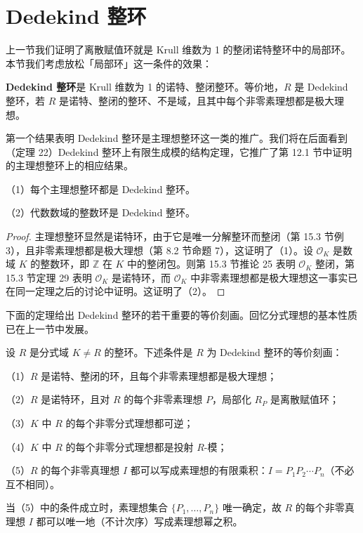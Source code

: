 \section{Dedekind 整环}

上一节我们证明了离散赋值环就是 Krull 维数为 1 的整闭诺特整环中的局部环。本节我们考虑放松「局部环」这一条件的效果：

\begin{definition}
\textbf{Dedekind 整环}是 Krull 维数为 1 的诺特、整闭整环。等价地，\(R\) 是 Dedekind 整环，若 \(R\) 是诺特、整闭的整环、不是域，且其中每个非零素理想都是极大理想。
\end{definition}

第一个结果表明 Dedekind 整环是主理想整环这一类的推广。我们将在后面看到（定理 22）Dedekind 整环上有限生成模的结构定理，它推广了第 12.1 节中证明的主理想整环上的相应结果。

\begin{proposition}\label{pro:16.14}
（1）每个主理想整环都是 Dedekind 整环。

（2）代数数域的整数环是 Dedekind 整环。
\end{proposition}

\begin{proof}
主理想整环显然是诺特环，由于它是唯一分解整环而整闭（第 15.3 节例 3），且非零素理想都是极大理想（第 8.2 节命题 7），这证明了（1）。设 \(\mathcal{O}_K\) 是数域 \(K\) 的整数环，即 \(\mathbb{Z}\) 在 \(K\) 中的整闭包。则第 15.3 节推论 25 表明 \(\mathcal{O}_K\) 整闭，第 15.3 节定理 29 表明 \(\mathcal{O}_K\) 是诺特环，而 \(\mathcal{O}_K\) 中非零素理想都是极大理想这一事实已在同一定理之后的讨论中证明。这证明了（2）。
\end{proof}

下面的定理给出 Dedekind 整环的若干重要的等价刻画。回忆分式理想的基本性质已在上一节中发展。

\begin{theorem}\label{thm:16.15}
设 \(R\) 是分式域 \(K \neq R\) 的整环。下述条件是 \(R\) 为 Dedekind 整环的等价刻画：

（1）\(R\) 是诺特、整闭的环，且每个非零素理想都是极大理想；

（2）\(R\) 是诺特环，且对 \(R\) 的每个非零素理想 \(P\)，局部化 \(R_P\) 是离散赋值环；

（3）\(K\) 中 \(R\) 的每个非零分式理想都可逆；

（4）\(K\) 中 \(R\) 的每个非零分式理想都是投射 \(R\)-模；

（5）\(R\) 的每个非零真理想 \(I\) 都可以写成素理想的有限乘积：\(I = P_1P_2\cdots P_n\)（不必互不相同）。

当（5）中的条件成立时，素理想集合 \(\{P_1, \ldots, P_n\}\) 唯一确定，故 \(R\) 的每个非零真理想 \(I\) 都可以唯一地（不计次序）写成素理想幂之积。
\end{theorem}

